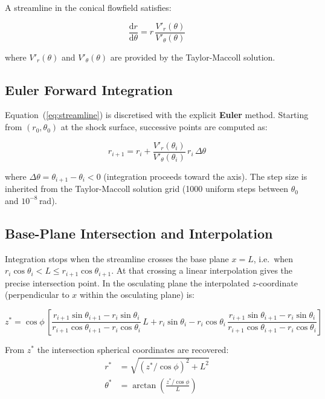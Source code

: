 \documentclass[12pt,a4paper]{article}
\begin{document}
A streamline in the conical flowfield satisfies:

\begin{equation}
    \frac{\mathrm{d}r}{\mathrm{d}\theta} = r\,\frac{V'_r(\theta)}{V'_\theta(\theta)}
    \label{eq:streamline}
\end{equation}

where $V'_r(\theta)$ and $V'_\theta(\theta)$ are provided by the
Taylor-Maccoll solution.

\subsection{Euler Forward Integration}

Equation~(\ref{eq:streamline}) is discretised with the explicit \textbf{Euler}
method.  Starting from $(r_0, \theta_0)$ at the shock surface, successive
points are computed as:

\begin{equation}
    r_{i+1} = r_i + \frac{V'_r(\theta_i)}{V'_\theta(\theta_i)}\,r_i\,\Delta\theta
    \label{eq:euler}
\end{equation}

where $\Delta\theta = \theta_{i+1} - \theta_i < 0$ (integration proceeds toward
the axis).  The step size is inherited from the Taylor-Maccoll solution grid
(1000 uniform steps between $\theta_0$ and $10^{-8}$\,rad).

\subsection{Base-Plane Intersection and Interpolation}

Integration stops when the streamline crosses the base plane $x = L$, i.e.\
when $r_i\cos\theta_i < L \leq r_{i+1}\cos\theta_{i+1}$.  At that crossing a
linear interpolation gives the precise intersection point.  In the osculating
plane the interpolated $z$-coordinate (perpendicular to $x$ within the
osculating plane) is:

\begin{equation}
    z^* = \cos\phi\,\left[
        \frac{r_{i+1}\sin\theta_{i+1} - r_i\sin\theta_i}
             {r_{i+1}\cos\theta_{i+1} - r_i\cos\theta_i}\,L
        + r_i\sin\theta_i
        - r_i\cos\theta_i\,
          \frac{r_{i+1}\sin\theta_{i+1} - r_i\sin\theta_i}
               {r_{i+1}\cos\theta_{i+1} - r_i\cos\theta_i}
    \right]
    \label{eq:interp}
\end{equation}

From $z^*$ the intersection spherical coordinates are recovered:
\begin{align}
    r^* &= \sqrt{(z^*/\cos\phi)^2 + L^2}\\
    \theta^* &= \arctan\!\left(\frac{z^*/\cos\phi}{L}\right)
\end{align}
\end{document}
